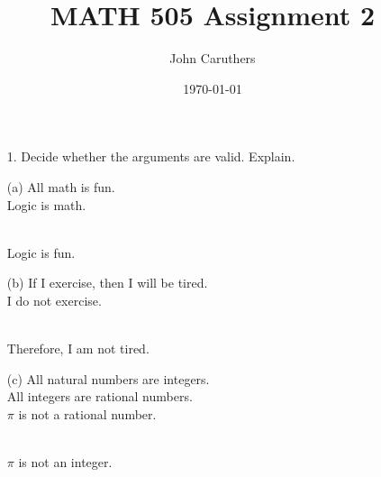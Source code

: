 \documentclass{article}
\title{MATH 505 Assignment 2}
\author{John Caruthers}
\date\today
\begin{document}
\maketitle

\begin{itemize}
    \item[1.] Decide whether the arguments are valid. Explain.
    
    (a) All math is fun.\\
    \hspace*{0.6cm}Logic is math.\\
    \\
    \hspace*{0.6cm}Logic is fun.
    
    
    (b) If I exercise, then I will be tired.\\
    \hspace*{0.6cm}I do not exercise.\\
    \\
    \hspace*{0.6cm}Therefore, I am not tired.
    
    
    (c) All natural numbers are integers.\\
    \hspace*{0.55cm}All integers are rational numbers.\\
    \hspace*{0.6cm}$\pi$ is not a rational number.\\
    \\
    \hspace*{0.6cm}$\pi$ is not an integer.
    

\end{itemize}
\end{document}
